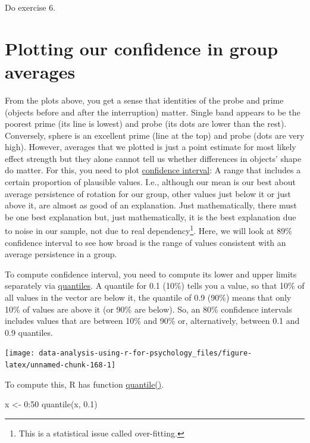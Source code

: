 \documentclass[
]{book}
\newenvironment{Shaded}{\begin{snugshade}}{\end{snugshade}}
\newcommand{\DecValTok}[1]{\textcolor[rgb]{0.00,0.00,0.81}{#1}}
\newcommand{\FloatTok}[1]{\textcolor[rgb]{0.00,0.00,0.81}{#1}}
\newcommand{\FunctionTok}[1]{\textcolor[rgb]{0.00,0.00,0.00}{#1}}
\newcommand{\NormalTok}[1]{#1}
\newcommand{\OtherTok}[1]{\textcolor[rgb]{0.56,0.35,0.01}{#1}}
\newcommand{\SpecialCharTok}[1]{\textcolor[rgb]{0.00,0.00,0.00}{#1}}
\begin{document}
Do exercise 6.

\hypertarget{plotting-our-confidence-in-group-averages}{%
\section{Plotting our confidence in group averages}\label{plotting-our-confidence-in-group-averages}}

From the plots above, you get a sense that identities of the probe and prime (objects before and after the interruption) matter. Single band appears to be the poorest prime (its line is lowest) and probe (its dots are lower than the rest). Conversely, sphere is an excellent prime (line at the top) and probe (dots are very high). However, averages that we plotted is just a point estimate for most likely effect strength but they alone cannot tell us whether differences in objects' shape do matter. For this, you need to plot \href{https://en.wikipedia.org/wiki/Confidence_interval}{confidence interval}: A range that includes a certain proportion of plausible values. I.e., although our mean is our best about average persistence of rotation for our group, other values just below it or just above it, are almost as good of an explanation. Just mathematically, there must be one best explanation but, just mathematically, it is the best explanation due to noise in our sample, not due to real dependency\footnote{This is a statistical issue called over-fitting.}. Here, we will look at 89\% confidence interval to see how broad is the range of values consistent with an average persistence in a group.

To compute confidence interval, you need to compute its lower and upper limits separately via \href{https://en.wikipedia.org/wiki/Quantile}{quantiles}. A quantile for 0.1 (10\%) tells you a value, so that 10\% of all values in the vector are below it, the quantile of 0.9 (90\%) means that only 10\% of values are above it (or 90\% are below). So, an 80\% confidence intervals includes values that are between 10\% and 90\% or, alternatively, between 0.1 and 0.9 quantiles.

\begin{center}\texttt{[image: data-analysis-using-r-for-psychology\_files/figure-latex/unnamed-chunk-168-1]} \end{center}

To compute this, R has function \href{https://stat.ethz.ch/R-manual/R-devel/library/stats/html/quantile.html}{quantile()}.

\begin{Shaded}
\begin{Highlighting}[]
\NormalTok{x }\OtherTok{\textless{}{-}} \DecValTok{0}\SpecialCharTok{:}\DecValTok{50}
\FunctionTok{quantile}\NormalTok{(x, }\FloatTok{0.1}\NormalTok{)}
\end{Highlighting}
\end{Shaded}
\end{document}
